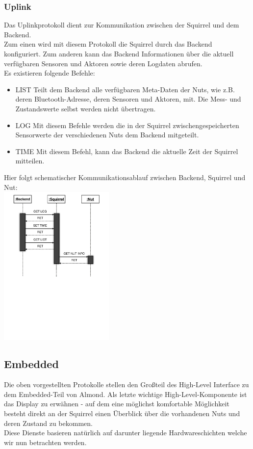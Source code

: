 \documentclass[12pt,a4paper]{article}
\begin{document}
	\subsubsection{Uplink}
Das Uplinkprotokoll dient zur Kommunikation zwischen der Squirrel und dem Backend.\\
Zum einen wird mit diesem Protokoll die Squirrel durch das Backend konfiguriert. Zum anderen kann das Backend Informationen über die aktuell verfügbaren Sensoren und Aktoren sowie deren Logdaten abrufen.\\
Es existieren folgende Befehle:
\begin{itemize}
	\item{LIST}
Teilt dem Backend alle verfügbaren Meta-Daten der Nuts, wie z.B. deren Bluetooth-Adresse, deren Sensoren und Aktoren, mit. Die Mess- und Zustandswerte selbst werden nicht übertragen.

	\item{LOG}
Mit diesem Befehle werden die in der Squirrel zwischengespeicherten Sensorwerte der verschiedenen Nuts dem Backend mitgeteilt.

	\item{TIME}
Mit diesem Befehl, kann das Backend die aktuelle Zeit der Squirrel mitteilen.

\end{itemize}
Hier folgt schematischer Kommunikationsablauf zwischen Backend, Squirrel und Nut:\\ 
\includegraphics[height=8cm]{./ProtokollSequence.pdf}\\
\subsection{Embedded}
Die oben vorgestellten Protokolle stellen den Großteil des High-Level Interface zu dem Embedded-Teil von Almond. Als letzte wichtige High-Level-Komponente ist das Display zu erwähnen - auf dem eine möglichst komfortable Möglichkeit besteht direkt an der Squirrel einen Überblick über die vorhandenen Nuts und deren Zustand zu bekommen.\\
Diese Dienste basieren natürlich auf darunter liegende Hardwareschichten welche wir nun betrachten werden.\\
\end{document}
